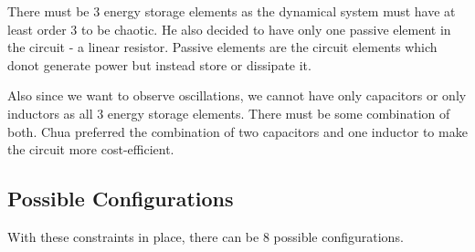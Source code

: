 \documentclass[12pt]{article}
\begin{document}
There must be 3 energy storage elements as the dynamical system must have at least order 3 to be chaotic. He also decided to have only one passive element in the circuit - a linear resistor. \linebreak
Passive elements are the circuit elements which donot generate power but instead store or dissipate it. \linebreak

Also since we want to observe oscillations, we cannot have only capacitors or only inductors as all 3 energy storage elements. There must be some combination of both. Chua preferred the combination of two capacitors and one inductor to make the circuit more cost-efficient. 
%
\subsection{Possible Configurations}
With these constraints in place, there can be 8 possible configurations. 
\end{document}
